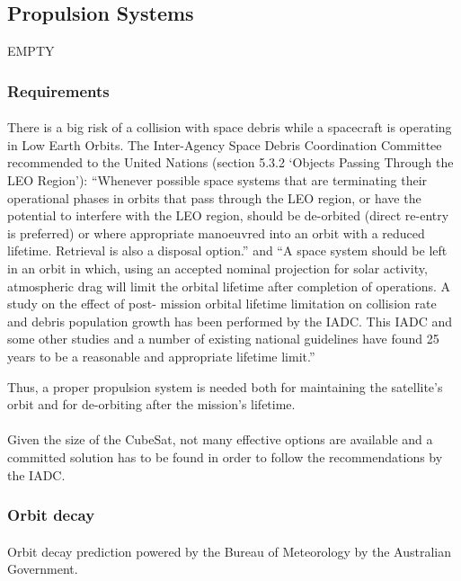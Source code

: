 \subsection{Propulsion Systems}

EMPTY

\subsubsection{Requirements}
\paragraph{}There is a big risk of a collision with space debris while a spacecraft is operating in Low Earth Orbits. The Inter-Agency Space Debris Coordination Committee recommended to the United Nations (section 5.3.2 ‘Objects Passing Through the LEO Region’): “Whenever possible space systems that are terminating their operational phases in orbits that pass through the LEO region, or have the potential to interfere with the LEO region, should be de-orbited (direct re-entry is preferred) or where appropriate manoeuvred into an orbit with a reduced lifetime. Retrieval is also a disposal option.” and “A space system should be left in an orbit in which, using an accepted nominal projection for solar activity, atmospheric drag will limit the orbital lifetime after completion of operations. A study on the effect of post- mission orbital lifetime limitation on collision rate and debris population growth has been performed by the IADC. This IADC and some other studies and a number of existing national guidelines have found 25 years to be a reasonable and appropriate lifetime limit.”

Thus, a proper propulsion system is needed both for maintaining the satellite's orbit and for de-orbiting after the mission's lifetime.

\paragraph{}Given the size of the CubeSat, not many effective options are available and a committed solution has to be found in order to follow the recommendations by the IADC.

\subsubsection{Orbit decay}

\paragraph{}Orbit decay prediction powered by the Bureau of Meteorology by the Australian Government.

